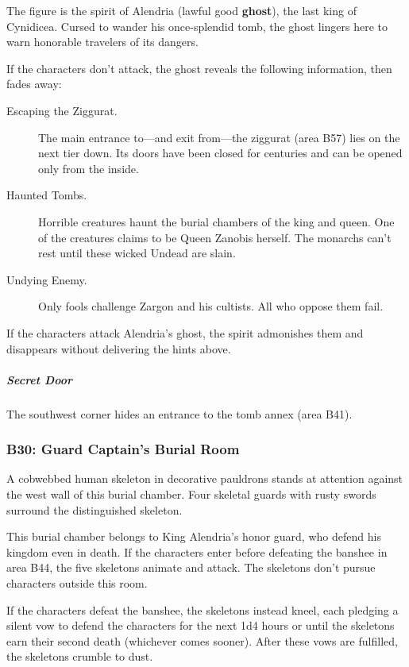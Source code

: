 \documentclass[10pt,a4paper,twoside,bg=print,twocolumn,openany,nodeprecatedcode]{dndbook}
\begin{document}
The figure is the spirit of Alendria (lawful good \textbf{ghost}), the last king of Cynidicea. Cursed to wander his once-splendid tomb, the ghost lingers here to warn honorable travelers of its dangers.

If the characters don't attack, the ghost reveals the following information, then fades away:


\begin{description}
\item[Escaping the Ziggurat.]
The main entrance to—and exit from—the ziggurat (area B57) lies on the next tier down. Its doors have been closed for centuries and can be opened only from the inside.
\item[Haunted Tombs.]
Horrible creatures haunt the burial chambers of the king and queen. One of the creatures claims to be Queen Zanobis herself. The monarchs can't rest until these wicked Undead are slain.
\item[Undying Enemy.]
Only fools challenge Zargon and his cultists. All who oppose them fail.
\end{description}

If the characters attack Alendria's ghost, the spirit admonishes them and disappears without delivering the hints above.

\subparagraph{Secret Door}
The southwest corner hides an entrance to the tomb annex (area B41).

\subsubsection{B30: Guard Captain's Burial Room}
\begin{DndReadAloud}{}
A cobwebbed human skeleton in decorative pauldrons stands at attention against the west wall of this burial chamber. Four skeletal guards with rusty swords surround the distinguished skeleton.

\end{DndReadAloud}

This burial chamber belongs to King Alendria's honor guard, who defend his kingdom even in death. If the characters enter before defeating the banshee in area B44, the five skeletons animate and attack. The skeletons don't pursue characters outside this room.

If the characters defeat the banshee, the skeletons instead kneel, each pledging a silent vow to defend the characters for the next 1d4 hours or until the skeletons earn their second death (whichever comes sooner). After these vows are fulfilled, the skeletons crumble to dust.
\end{document}
